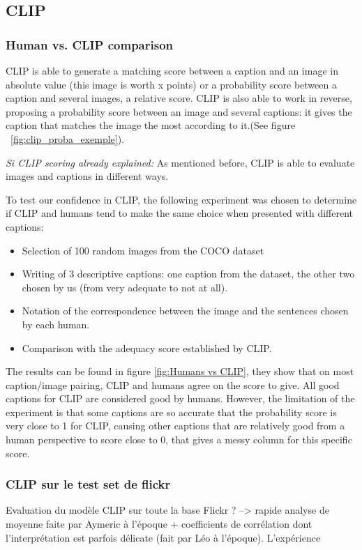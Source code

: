 \documentclass{article}
\begin{document}
\subsection{CLIP}



\subsubsection{Human vs. CLIP comparison}

CLIP is able to generate a matching score between a caption and an image in absolute value (this image is worth x points) or a probability score between a caption and several images, a relative score.
CLIP is also able to work in reverse, proposing a probability score between an image and several captions: it gives the caption that matches the image the most according to it.(See figure ~\ref{fig:clip_proba_exemple}).

\textit{Si CLIP scoring already explained:} As mentioned before, CLIP is able to evaluate images and captions in different ways.

To test our confidence in CLIP, the following experiment was chosen to determine if CLIP and humans tend to make the same choice when presented with different captions: 
\begin{itemize}
  \item Selection of 100 random images from the COCO dataset
  \item Writing of 3 descriptive captions: one caption from the dataset, the other two chosen by us (from very adequate to not at all).
  \item Notation of the correspondence between the image and the sentences chosen by each human.
  \item Comparison with the adequacy score established by CLIP.
\end{itemize}

The results can be found in figure \ref{fig:Humans vs CLIP}, they show that on most caption/image pairing, CLIP and humans agree on the score to give. All good captions for CLIP are considered good by humans. However, the limitation of the experiment is that some captions are so accurate that the probability score is very close to 1 for CLIP, causing other captions that are relatively good from a human perspective to score close to 0, that gives a messy column for this specific score.

\subsubsection{CLIP sur le test set de flickr}
Evaluation du modèle CLIP sur toute la base Flickr ? --> rapide analyse de moyenne faite par Aymeric à l'époque + coefficients de corrélation dont l'interprétation est parfois délicate (fait par Léo à l'époque). L'expérience 
\end{document}

